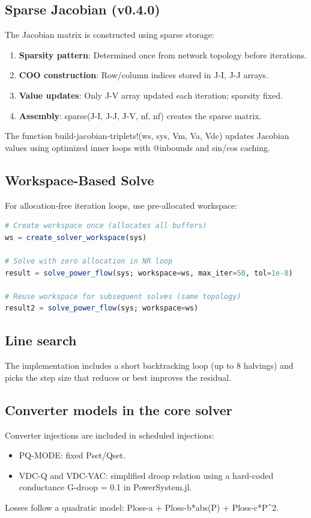 \documentclass[11pt]{article}
\def\code#1{#1}%
\def\file#1{#1}%
\def\_{-}%
\newcommand{\code}[1]{\nolinkurl{#1}}
\newcommand{\file}[1]{\path{#1}}
\begin{document}
\subsection{Sparse Jacobian (v0.4.0)}
The Jacobian matrix is constructed using sparse storage:
\begin{enumerate}
  \item \textbf{Sparsity pattern}: Determined once from network topology before iterations.
  \item \textbf{COO construction}: Row/column indices stored in \code{J\_I}, \code{J\_J} arrays.
  \item \textbf{Value updates}: Only \code{J\_V} array updated each iteration; sparsity fixed.
  \item \textbf{Assembly}: \code{sparse(J\_I, J\_J, J\_V, nf, nf)} creates the sparse matrix.
\end{enumerate}

The function \code{build\_jacobian\_triplets!(ws, sys, Vm, Va, Vdc)} updates Jacobian values using optimized inner loops with \code{@inbounds} and sin/cos caching.

\subsection{Workspace-Based Solve}
For allocation-free iteration loops, use pre-allocated workspace:
\begin{lstlisting}[language=Julia]
# Create workspace once (allocates all buffers)
ws = create_solver_workspace(sys)

# Solve with zero allocation in NR loop
result = solve_power_flow(sys; workspace=ws, max_iter=50, tol=1e-8)

# Reuse workspace for subsequent solves (same topology)
result2 = solve_power_flow(sys; workspace=ws)
\end{lstlisting}

\subsection{Line search}
The implementation includes a short backtracking loop (up to 8 halvings) and picks the step size that reduces or best improves the residual.

\subsection{Converter models in the core solver}
Converter injections are included in scheduled injections:
\begin{itemize}[leftmargin=*]
  \item \code{PQ\_MODE}: fixed \code{Pset/Qset}.
  \item \code{VDC\_Q} and \code{VDC\_VAC}: simplified droop relation using a hard-coded conductance \code{G\_droop = 0.1} in \file{PowerSystem.jl}.
\end{itemize}
Losses follow a quadratic model: \code{Ploss\_a + Ploss\_b*abs(P) + Ploss\_c*P^2}.
\end{document}

